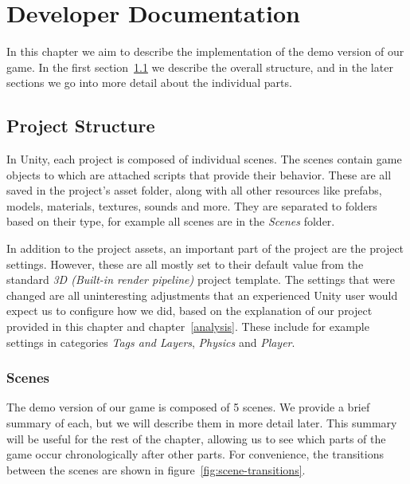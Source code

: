 \chapter{Developer Documentation}

In this chapter we aim to describe the implementation of the demo version of our game.
In the first section~\ref{sec:docs-proj} we describe the overall structure, and in the later sections we go into more detail about the individual parts.

\section{Project Structure}\label{sec:docs-proj}

In Unity, each project is composed of individual scenes.
The scenes contain game objects to which are attached scripts that provide their behavior.
These are all saved in the project's asset folder, along with all other resources like prefabs, models, materials, textures, sounds and more.
They are separated to folders based on their type, for example all scenes are in the \emph{Scenes} folder.

In addition to the project assets, an important part of the project are the project settings.
However, these are all mostly set to their default value from the standard \emph{3D (Built-in render pipeline)} project template.
The settings that were changed are all uninteresting adjustments that an experienced Unity user would expect us to configure how we did, based on the explanation of our project provided in this chapter and chapter~\ref{analysis}.
These include for example settings in categories \emph{Tags and Layers}, \emph{Physics} and \emph{Player}.

\subsection{Scenes}\label{sec:docs-scenes}

The demo version of our game is composed of 5 scenes.
We provide a brief summary of each, but we will describe them in more detail later.
This summary will be useful for the rest of the chapter, allowing us to see which parts of the game occur chronologically after other parts.
For convenience, the transitions between the scenes are shown in figure~\ref{fig:scene-transitions}.

